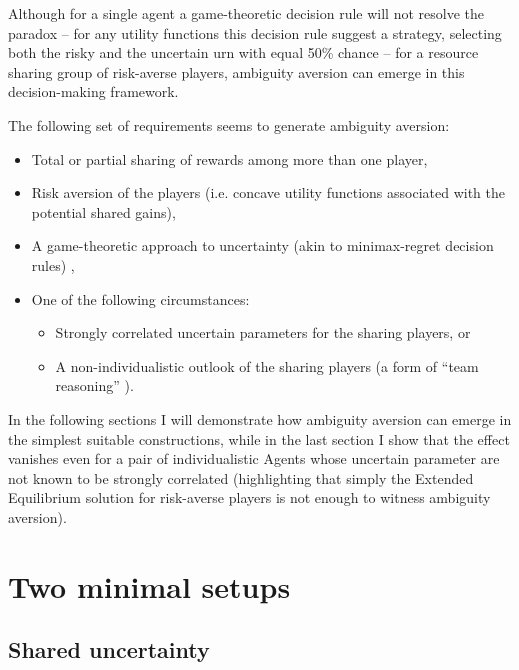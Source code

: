 \documentclass{article}
\theoremstyle{definition}
\begin{document}
Although for a single agent a game-theoretic decision rule will not resolve the paradox \cite{essay:EssayOnUncertaintyKonczer2024} -- for any utility functions this decision rule suggest a strategy, selecting both the risky and the uncertain urn with equal 50\% chance -- for a resource sharing group of risk-averse players, ambiguity aversion can emerge in this decision-making framework.

The following set of requirements seems to generate ambiguity aversion:

\begin{itemize}
    \item Total or partial sharing of rewards among more than one player,
    \item Risk aversion of the players (i.e. concave utility functions associated with the potential shared gains),
    \item A game-theoretic approach to uncertainty (akin to minimax-regret decision rules) \cite{arxiv:ExtendedEquilibrium, essay:EssayOnUncertaintyKonczer2024, book:Savage},
    \item One of the following circumstances:
    \begin{itemize}
        \item Strongly correlated uncertain parameters for the sharing players, or
        \item A non-individualistic outlook of the sharing players (a form of ``team reasoning'' \cite{paper:TeamReasoning,book:TeamReasoning}).
    \end{itemize}
\end{itemize}

In the following sections I will demonstrate how ambiguity aversion can emerge in the simplest suitable constructions, while in the last section I show that the effect vanishes even for a pair of individualistic Agents whose uncertain parameter are not known to be strongly correlated (highlighting that simply the Extended Equilibrium solution \cite{arxiv:ExtendedEquilibrium} for risk-averse players is not enough to witness ambiguity aversion). 

\section{Two minimal setups}

\subsection{Shared uncertainty}
\end{document}
